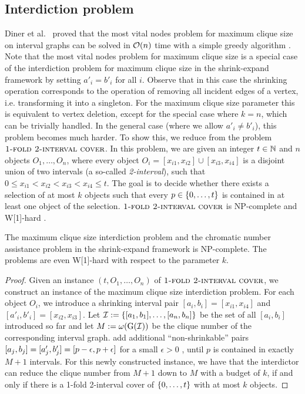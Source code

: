 \subsection{Interdiction problem}

Diner et al.\ \cite{diner2018contractionDeletionBlockers} proved that the most vital nodes problem for maximum clique size on interval graphs can be solved in $\mathcal{O}(n)$ time with a simple greedy algorithm \cite{diner2018contractionDeletionBlockers}. 
Note that the most vital nodes problem for maximum clique size is a special case of the interdiction problem for maximum clique size in the shrink-expand framework 
by setting $a'_i = b'_i$ for all $i$. Observe that in this case the shrinking operation corresponds 
to the operation of removing all incident edges of a vertex, i.e. transforming it into a singleton. For 
the maximum clique size parameter this is equivalent to vertex deletion, except for the special case where $k=n$, which can be trivially handled.
In the general case (where we allow $a'_i \neq b'_i$), this problem becomes much harder. To show this, we reduce from the problem $\textsc{1-fold 2-interval cover}$. In this problem, we are given an integer $t \in \mathbb{N}$ and $n$ objects $O_1,\dots,O_n$, where every object $O_i = [x_{i1},x_{i2}] \cup [x_{i3}, x_{i4}]$ is a disjoint union of two intervals (a so-called \emph{2-interval}), such that $0 \leq x_{i1} < x_{i2} < x_{i3} < x_{i4} \leq t$. The goal is to decide whether there exists a selection of at most $k$ objects such that every $p \in \{ 0, \ldots, t \}$ is contained in at least one object of the selection. $\textsc{1-fold 2-interval cover}$ is NP-complete \cite{ding2011onefold} and W[1]-hard \cite{approximability-c-interval}.

\begin{theorem}
The maximum clique size interdiction problem and the chromatic number assistance problem in the shrink-expand framework is NP-complete. The problems are even W[1]-hard with respect to the parameter $k$.
\end{theorem}
\begin{proof}
Given an instance $(t, O_1, \dots, O_n)$ of $\textsc{1-fold 2-interval cover}$, we construct an instance of the maximum clique size interdiction problem. For each object $O_i$, we introduce a shrinking interval pair $[a_i, b_i] = [x_{i1}, x_{i4}]$ and $[a'_i, b'_i] = [x_{i2},x_{i3}]$. Let $\mathcal{I} := \{ [a_1, b_1], \ldots, [a_n, b_n] \}$ be the set of all $[a_i, b_i]$ introduced so far and let $M := \omega(\operatorname{G}(\mathcal{I}))$ be the clique number of the corresponding interval graph.  add additional \enquote{non-shrinkable} pairs $[a_{j}, b_{j}] = [a'_{j}, b'_{j}] = [p- \epsilon, p + \epsilon]$ for a small $\epsilon > 0$ , until $p$ is contained in exactly $M + 1$ intervals. For this newly constructed instance, we have that the interdictor can reduce the clique number from $M + 1$ down to $M$ with a budget of $k$, if and only if there is a 1-fold 2-interval cover of $\{ 0, \ldots, t \}$ with at most $k$ objects.
 \end{proof}

